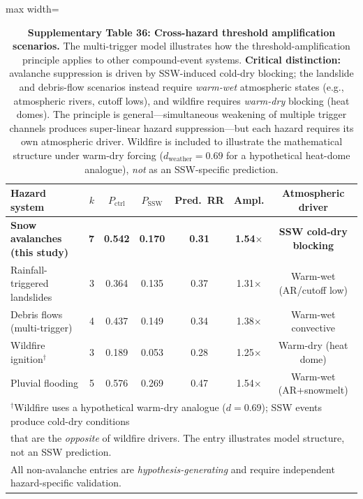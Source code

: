 \documentclass[11pt,letterpaper]{article}
\begin{document}
\begin{table}[h!]
\centering
\caption{\textbf{Supplementary Table 36: Cross-hazard threshold amplification scenarios.} The multi-trigger model illustrates how the threshold-amplification principle applies to other compound-event systems. \textbf{Critical distinction:} avalanche suppression is driven by SSW-induced cold-dry blocking; the landslide and debris-flow scenarios instead require \emph{warm-wet} atmospheric states (e.g., atmospheric rivers, cutoff lows), and wildfire requires \emph{warm-dry} blocking (heat domes). The principle is general---simultaneous weakening of multiple trigger channels produces super-linear hazard suppression---but each hazard requires its own atmospheric driver. Wildfire is included to illustrate the mathematical structure under warm-dry forcing ($d_{\mathrm{weather}} = 0.69$ for a hypothetical heat-dome analogue), \emph{not} as an SSW-specific prediction.}
\label{tab:cross_hazard}
\begin{adjustbox}{max width=\textwidth}
\begin{tabular}{lrccccc}
\toprule
Hazard system & $k$ & $P_{\mathrm{ctrl}}$ & $P_{\mathrm{SSW}}$ & Pred.\ RR & Ampl. & Atmospheric driver \\
\midrule
\textbf{Snow avalanches (this study)} & \textbf{7} & \textbf{0.542} & \textbf{0.170} & \textbf{0.31} & \textbf{1.54$\times$} & \textbf{SSW cold-dry blocking} \\
Rainfall-triggered landslides & 3 & 0.364 & 0.135 & 0.37 & 1.31$\times$ & Warm-wet (AR/cutoff low) \\
Debris flows (multi-trigger) & 4 & 0.437 & 0.149 & 0.34 & 1.38$\times$ & Warm-wet convective \\
Wildfire ignition$^{\dagger}$ & 3 & 0.189 & 0.053 & 0.28 & 1.25$\times$ & Warm-dry (heat dome) \\
Pluvial flooding & 5 & 0.576 & 0.269 & 0.47 & 1.54$\times$ & Warm-wet (AR+snowmelt) \\
\bottomrule
\multicolumn{7}{l}{\footnotesize $^{\dagger}$Wildfire uses a hypothetical warm-dry analogue ($d = 0.69$); SSW events produce cold-dry conditions} \\
\multicolumn{7}{l}{\footnotesize that are the \emph{opposite} of wildfire drivers. The entry illustrates model structure, not an SSW prediction.} \\
\multicolumn{7}{l}{\footnotesize All non-avalanche entries are \emph{hypothesis-generating} and require independent hazard-specific validation.} \\
\end{tabular}
\end{adjustbox}
\end{table}
\end{document}
